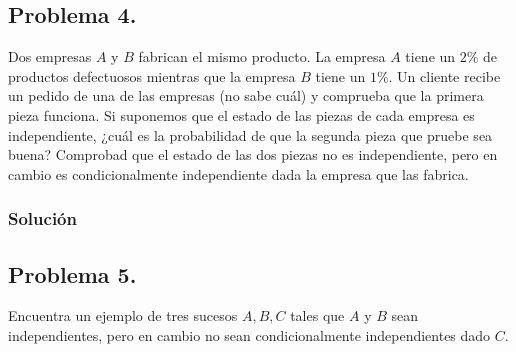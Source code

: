 \documentclass[
]{article}
\begin{document}
\hypertarget{problema-4.}{%
\subsection{Problema 4.}\label{problema-4.}}

Dos empresas \(A\) y \(B\) fabrican el mismo producto. La empresa \(A\)
tiene un \(2\%\) de productos defectuosos mientras que la empresa \(B\)
tiene un \(1\%\). Un cliente recibe un pedido de una de las empresas (no
sabe cuál) y comprueba que la primera pieza funciona. Si suponemos que
el estado de las piezas de cada empresa es independiente, ¿cuál es la
probabilidad de que la segunda pieza que pruebe sea buena? Comprobad que
el estado de las dos piezas no es independiente, pero en cambio es
condicionalmente independiente dada la empresa que las fabrica.

\hypertarget{soluciuxf3n-20}{%
\subsubsection{Solución}\label{soluciuxf3n-20}}

\hypertarget{problema-5.}{%
\subsection{Problema 5.}\label{problema-5.}}

Encuentra un ejemplo de tres sucesos \(A,B,C\) tales que \(A\) y \(B\)
sean independientes, pero en cambio no sean condicionalmente
independientes dado \(C\).
\end{document}
